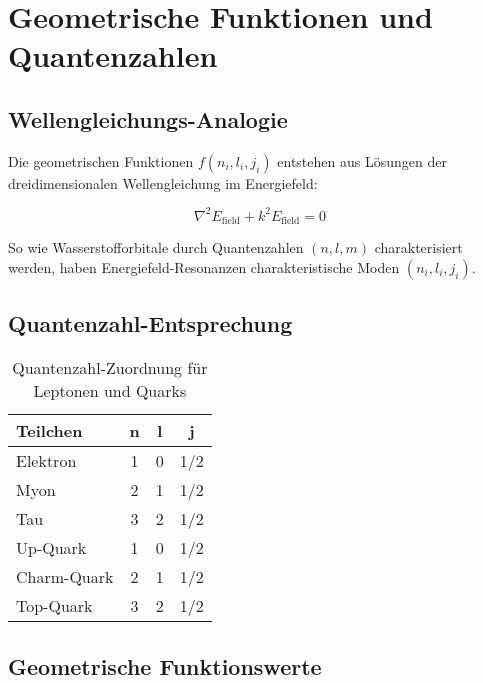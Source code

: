 \documentclass[12pt,a4paper]{article}
\newcommand{\Efield}{E_{\text{field}}}
\begin{document}
	\section{Geometrische Funktionen und Quantenzahlen}
	\label{sec:geometric_functions}
	
	\subsection{Wellengleichungs-Analogie}
	\label{subsec:wave_equation_analogy}
	
	Die geometrischen Funktionen $f(n_i, l_i, j_i)$ entstehen aus Lösungen der dreidimensionalen Wellengleichung im Energiefeld:
	
	\begin{equation}
		\nabla^2 \Efield + k^2 \Efield = 0
	\end{equation}
	
	So wie Wasserstofforbitale durch Quantenzahlen $(n, l, m)$ charakterisiert werden, haben Energiefeld-Resonanzen charakteristische Moden $(n_i, l_i, j_i)$.
	
	\subsection{Quantenzahl-Entsprechung}
	\label{subsec:quantum_number_correspondence}
	
	\begin{table}[htbp]
		\centering
		\begin{tabular}{lccc}
			\toprule
			\textbf{Teilchen} & \textbf{n} & \textbf{l} & \textbf{j} \\
			\midrule
			Elektron & 1 & 0 & 1/2 \\
			Myon & 2 & 1 & 1/2 \\
			Tau & 3 & 2 & 1/2 \\
			\midrule
			Up-Quark & 1 & 0 & 1/2 \\
			Charm-Quark & 2 & 1 & 1/2 \\
			Top-Quark & 3 & 2 & 1/2 \\
			\bottomrule
		\end{tabular}
		\caption{Quantenzahl-Zuordnung für Leptonen und Quarks}
		\label{tab:quantum_numbers}
	\end{table}
	
	\subsection{Geometrische Funktionswerte}
	\label{subsec:geometric_function_values}
	
\end{document}
